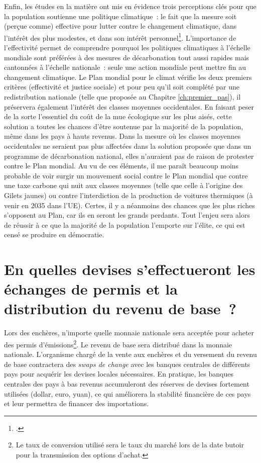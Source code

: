 \documentclass[a5paper,french,openany]{memoir}
\begin{document}
Enfin, les études en la matière ont mis en évidence trois perceptions clés pour que la population soutienne une politique climatique~: le fait que la mesure soit (perçue comme) effective pour lutter contre le changement climatique, dans l'intérêt des plus modestes, et dans son intérêt personnel\footnote{\cite{dechezlepretre_fighting_2022}.}. L'importance de l'effectivité permet de comprendre pourquoi les politiques climatiques à l'échelle mondiale sont préférées à des mesures de décarbonation tout aussi rapides mais cantonnées à l'échelle nationale~: seule une action mondiale peut mettre fin au changement climatique. Le Plan mondial pour le climat vérifie les deux premiers critères (effectivité et justice sociale) et pour peu qu'il soit complété par une redistribution nationale (telle que proposée au Chapitre \ref{ch:premier_pas}), il préservera également l'intérêt des classes moyennes occidentales. En faisant peser de la sorte l'essentiel du coût de la mue écologique sur les plus aisés, cette solution a toutes les chances d'être soutenue par la majorité de la population, même dans les pays à hauts revenus. Dans la mesure où les classes moyennes occidentales ne seraient pas plus affectées dans la solution proposée que dans un programme de décarbonation national, elles n'auraient pas de raison de protester contre le Plan mondial. Au vu de ces éléments, il me paraît beaucoup moins probable de voir surgir un mouvement social contre le Plan mondial que contre une taxe carbone qui nuit aux classes moyennes (telle que celle à l'origine des Gilets jaunes) ou contre l'interdiction de la production de voitures thermiques (à venir en 2035 dans l'UE). Certes, il y a néanmoins des chances que les plus riches s'opposent au Plan, car ils en seront les grands perdants. Tout l'enjeu sera alors de réussir à ce que la majorité de la population l'emporte sur l'élite, ce qui est censé se produire en démocratie.


\section*{\normalsize En quelles devises s'effectueront les échanges de permis et la distribution du revenu de base~?}\label{q:devise}

Lors des enchères, n'importe quelle monnaie nationale sera acceptée pour acheter des permis d'émissions\footnote{Le taux de conversion utilisé sera le taux du marché lors de la date butoir pour la transmission des options d'achat.}. Le revenu de base sera distribué dans la monnaie nationale. L'organisme chargé de la vente aux enchères et du versement du revenu de base contractera des \textit{swaps de change} avec les banques centrales de différents pays pour acquérir les devises locales nécessaires. En pratique, les banques centrales des pays à bas revenus accumuleront des réserves de devises fortement utilisées (dollar, euro, yuan), ce qui améliorera la stabilité financière de ces pays et leur permettra de financer des importations.
\end{document}
